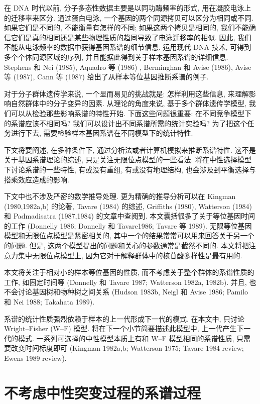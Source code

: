 \documentclass[
    12pt,%
    ]{article}
\begin{document}
在 DNA 时代以前, 分子多态性数据主要是以同功酶频率的形式, 用在凝胶电泳上的迁移率来区分. 通过蛋白电泳,
一个基因的两个同源拷贝可以区分为相同或不同. 如果它们是不同的, 不能衡量有怎样的不同; 如果这两个拷贝是相同的,
我们不能确信它们是真的相同还是某些物理性质的趋同导致了电泳迁移率的相似. 因此,
我们不能从电泳频率的数据中获得基因系谱的细节信息. 运用现代 DNA 技术, 可得到多个个体同源区域的序列,
并且能据此得到关于样本基因系谱的详细信息. Stephens 和 Nei (1985), Aquadro 等 (1986) , Berminghan 和 Avise
(1986), Avise 等 (1987), Cann 等 (1987) 给出了从样本等位基因推断系谱的例子.

对于分子群体遗传学来说, 一个显而易见的挑战就是: 怎样利用这些信息, 来理解影响自然群体中的分子变异的因素. 从理论的角度来说,
基于多个群体遗传学模型, 我们可以从检验那些影响系谱的特性开始. 下面这些问题很重要: 在不同竞争模型下的系谱应该不相同吗?
我们可以设计出不同系谱所需的统计实验吗? 为了把这个任务进行下去, 需要检验样本基因系谱在不同模型下的统计特性.

下文将要阐述, 在多种条件下, 通过分析法或者计算机模拟来推断系谱特性. 这不是关于基因系谱理论的综述, 只是关注无限位点模型的一些看法.
将在中性选择模型下讨论系谱的一些特性, 有或没有重组, 有或没有地理结构, 也会涉及到平衡选择与搭乘效应造成的影响.

下文中也不涉及严密的数学推导处理. 更为精确的推导分析可以在 Kingman (1980,1982a,b) 的论著, Tavare (1984) 的综述,
Griffiths (1980), Watterson (1984) 和 Padmadisatra (1987,1984) 的文章中查阅到.
本文囊括很多了关于等位基因时间的工作 (Donnelly 1986; Donnelly 和 Tavare1986; Tavare 等 1989).
无限等位基因模型和无限位点模型是紧密相关的, 其中一个的结果常常可以用来回答关于另一个的问题. 但是,
这两个模型提出的问题和关心的参数通常是截然不同的. 本文将把注意力集中无限位点模型上,
因为它对于解释群体中的核苷酸多样性是最有用的.

本文将关注于相对小的样本等位基因的性质, 而不考虑关于整个群体的系谱性质的工作, 如固定时间等 (Donnelly 和 Tavare 1987;
Watterson 1982a, 1982b). 并且, 也不会讨论基因树和物种树之间关系 (Hudson 1983b, Neigl 和 Avise 1986; Pamilo
和 Nei 1988; Takahata 1989).

系谱的统计性质强烈依赖于样本的上一代形成下一代的模式. 在本文中, 只讨论 Wright--Fisher (W--F) 模型.
将在下一个小节简要描述此模型中, 上一代产生下一代的模式. 一系列可选择的中性模型本质上有和 W--F 模型相同的系谱性质,
只需要改变时间标度即可 (Kingman 1982a,b; Watterson 1975; Tavare 1984 review; Ewens 1989 review).

\section{不考虑中性突变过程的系谱过程}
\end{document}
